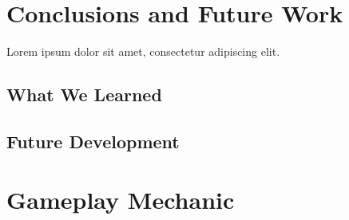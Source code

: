 \documentclass[conference]{IEEEtran}
\begin{document}
\section{Conclusions and Future Work}
\label{sec:conclusions}

Lorem ipsum dolor sit amet, consectetur adipiscing elit.

\subsection{What We Learned}

\subsection{Future Development}

\appendices%
\section{Gameplay Mechanic}\label{app:gameplay}




\end{document}
